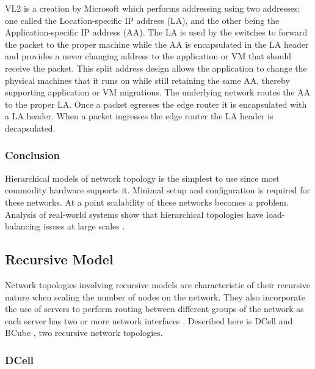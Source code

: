 \documentclass[12pt]{article}
\begin{document}
VL2 is a creation by Microsoft which performs addressing using two addresses: one called the Location-specific IP address (LA), and the other being the Application-specific IP address (AA). The LA is used by the switches to forward the packet to the proper machine while the AA is encapsulated in the LA header and provides a never changing address to the application or VM that should receive the packet. This split address design allows the application to change the physical machines that it runs on while still retaining the same AA, thereby supporting application or VM migrations. The underlying network routes the AA to the proper LA. Once a packet egresses the edge router it is encapsulated with a LA header. When a packet ingresses the edge router the LA header is decapsulated.


\subsubsection{Conclusion} \label{ssub:hierarchical-concl}


Hierarchical models of network topology is the simplest to use since most commodity hardware supports it. Minimal setup and configuration is required for these networks. At a point scalability of these networks becomes a problem. Analysis of real-world systems show that hierarchical topologies have load-balancing issues at large scales \cite{singla2012jellyfish}.



\subsection{Recursive Model} \label{sub:net-recursive}

Network topologies involving recursive models are characteristic of their recursive nature when scaling the number of nodes on the network. They also incorporate the use of servers to perform routing between different groups of the network as each server has two or more network interfaces \cite{wang2015survey, xia2016survey}. Described here is DCell \cite{guo2008dcell} and BCube \cite{guo2009bcube}, two recursive network topologies.

\subsubsection{DCell} \label{subp:dcell}
\end{document}
